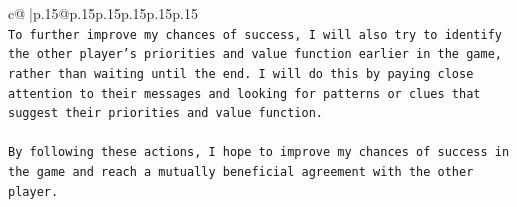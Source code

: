 \documentclass{article}
\begin{document}
{\begin{supertabular}{c@{$\;$}|p{.15\linewidth}@{}p{.15\linewidth}p{.15\linewidth}p{.15\linewidth}p{.15\linewidth}p{.15\linewidth}}
{{{\\ 
\texttt{To further improve my chances of success, I will also try to identify the other player's priorities and value function earlier in the game, rather than waiting until the end. I will do this by paying close attention to their messages and looking for patterns or clues that suggest their priorities and value function.} \\
\\ 
\texttt{By following these actions, I hope to improve my chances of success in the game and reach a mutually beneficial agreement with the other player.} \\
            }
        }
    }
     \\ \\

\end{supertabular}
}
\end{document}
